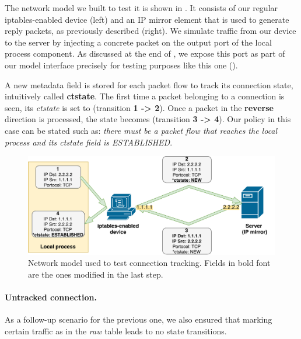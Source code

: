 The network model we built to test it is shown in
.  It consists of our regular
iptables-enabled device (left) and an IP mirror element that is used to
generate reply packets, as previously described (right).  We simulate traffic
from our device to the server by injecting a concrete packet on the output port
of the local process component.  As discussed at the end of
, we expose this port as part of our
model interface precisely for testing purposes like this one
().

A new metadata field is stored for each packet flow to track its connection
state, intuitively called \textbf{ctstate}.  The first time a packet belonging
to a connection is seen, its \emph{ctstate} is set to \NEW (transition
\textbf{1 -> 2}).  Once a packet in the \textbf{reverse} direction is
processed, the state becomes \ESTABLISHED (transition \textbf{3 -> 4}).  Our
policy in this case can be stated such as: \emph{there must be a packet flow
that reaches the local process and its ctstate field is ESTABLISHED}.

\begin{figure}[h]
  \centering
  \captionsetup{justification=centering}
  \includegraphics[scale=0.5]{assets/img/state-switch}
  \caption[Network model used to test connection tracking.]{Network model used
  to test connection tracking. Fields in bold font are the ones modified in the
  last step.}
  \label{fig:state-switch}
\end{figure}

\paragraph{Untracked connection.}
As a follow-up scenario for the previous one, we also ensured that marking
certain traffic as \UNTRACKED in the \emph{raw} table leads to no state
transitions.

\bigskip


